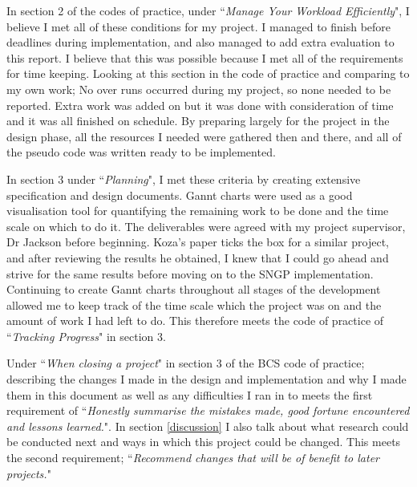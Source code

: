 \documentclass[a4paper,10.5pt]{article}
\begin{document}
In section 2 of the codes of practice,  under ``\emph{Manage Your Workload Efficiently}", I believe I met all of these conditions for my project. I managed to finish before deadlines during implementation, and also managed to add extra evaluation to this report. I believe that this was possible because I met all of the requirements for time keeping. Looking at this section in the code of practice and comparing to my own work; No over runs occurred during my project, so none needed to be reported. Extra work was added on but it was done with consideration of time and it was all finished on schedule. By preparing largely for the project in the design phase, all the resources I needed were gathered then and there, and all of the pseudo code was written ready to be implemented.

In section 3 under ``\emph{Planning}", I met these criteria by creating extensive specification and design documents. Gannt charts were used as a good visualisation tool for quantifying the remaining work to be done and the time scale on which to do it. The deliverables were agreed with my project supervisor, Dr Jackson before beginning. Koza's paper \cite{kozarng} ticks the box for a similar project, and after reviewing the results he obtained, I knew that I could go ahead and strive for the same results before moving on to the SNGP implementation. Continuing to create Gannt charts throughout all stages of the development allowed me to keep track of the time scale which the project was on and the amount of work I had left to do. This therefore meets the code of practice of ``\emph{Tracking Progress}" in section 3.

Under ``\emph{When closing a project}" in section 3 of the BCS code of practice; describing the changes I made in the design and implementation and why I made them in this document as well as any difficulties I ran in to meets the first requirement of ``\emph{Honestly summarise the mistakes made, good fortune encountered and lessons learned.}". In section \ref{discussion} I also talk about what research could be conducted next and ways in which this project could be changed. This meets the second requirement; ``\emph{Recommend changes that will be of benefit to later projects.}"
\end{document}

